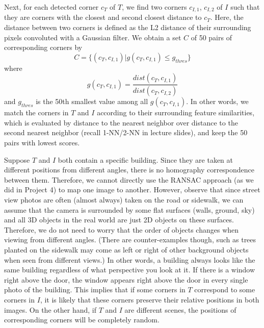 \documentclass[10pt,twocolumn,letterpaper]{article}
\begin{document}
Next, for each detected corner $c_T$ of $T$, we find two corners $c_{I,1}$, $c_{I,2}$ of $I$ such that they are corners with the closest and second closest distance to $c_T$. Here, the distance between two corners is defined as the L2 distance of their surrounding pixels convoluted with a Gaussian filter. We obtain a set $C$ of 50 pairs of corresponding corners by 
\[
    C = \{(c_T, c_{I,1}) | g(c_T, c_{I,1}) \leq g_{thres}\}
\]
where 
\[
    g(c_T, c_{I,1}) = \frac{dist(c_T, c_{I,1})}{dist(c_T, c_{I,2})}
\]
and $g_{thres}$ is the 50th smallest value among all $g(c_T, c_{I,1})$. In other words, we match the corners in $T$ and $I$ according to their surrounding feature similarities, which is evaluated by distance to the nearest neighbor over distance to the second nearest neighbor (recall 1-NN/2-NN in lecture slides), and keep the 50 pairs with lowest scores. \cite{Lowe04}

Suppose $T$ and $I$ both contain a specific building. Since they are taken at different positions from different angles, there is no homography correspondence between them. Therefore, we cannot directly use the RANSAC approach (as we did in Project 4) to map one image to another. However, observe that since street view photos are often (almost always) taken on the road or sidewalk, we can assume that the camera is surrounded by some flat surfaces (walls, ground, sky) and all 3D objects in the real world are just 2D objects on these surfaces. Therefore, we do not need to worry that the order of objects changes when viewing from different angles. (There are counter-examples though, such as trees planted on the sidewalk may come as left or right of other background objects when seen from different views.) In other words, a building always looks like the same building regardless of what perspective you look at it. If there is a window right above the door, the window appears right above the door in every single photo of the building. This implies that if some corners in $T$ correspond to some corners in $I$, it is likely that these corners preserve their relative positions in both images. On the other hand, if $T$ and $I$ are different scenes, the positions of corresponding corners will be completely random. 
\end{document}
